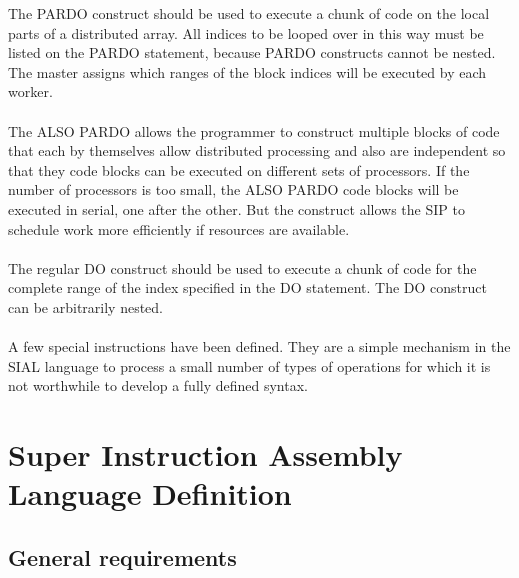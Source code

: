 \documentclass[12pt]{article}
\begin{document}
The PARDO construct should be used to execute a chunk of code on the local parts of 
a distributed array. All indices to be looped over in this way must be listed on the 
PARDO statement, because PARDO constructs cannot be nested. 
The master assigns which ranges of the block indices will be executed by each worker.\\
\\ 
The ALSO PARDO allows the programmer to construct multiple blocks of code that each 
by themselves allow distributed processing and also are independent so that they code 
blocks can be executed on different sets of processors. If the number of processors is 
too small, the ALSO PARDO code blocks will be executed in serial, one after the
other. But the construct allows the SIP to schedule work more efficiently if resources 
are available.\\
\\ 
The regular DO construct should be used to execute a chunk of code for the complete 
range of the index specified in the DO statement. The DO construct can be arbitrarily 
nested.\\
\\ 
A few special instructions have been defined. They are a simple mechanism in the SIAL 
language to process a small number of types of operations for which it is not worthwhile 
to develop a fully defined syntax.

\section{Super Instruction Assembly Language Definition}
\label{sect:sial}

\subsection{General requirements} 
\end{document}
